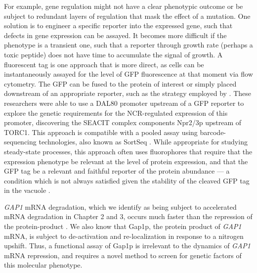 For example, gene regulation might not have a
clear phenotypic outcome or be subject to redundant layers of
regulation that mask the effect of a mutation. One solution is to
engineer a specific reporter into the expressed gene, such that
defects in gene expression can be assayed. It becomes more difficult
if the phenotype is a transient one, such that a reporter through
growth rate (perhaps a toxic peptide) does not have time to accumulate
the signal of growth. A fluorescent tag is one approach that is more
direct, as cells can be instantaneously assayed for the
level of GFP fluorescence at that moment via flow cytometry. The GFP
can be fused to the protein of interest or simply placed downstream of
an appropriate reporter, such as the strategy employed by 
\cite{neklesa2009genome}. 
These researchers were able to use a DAL80 promoter upstream of a GFP
reporter to explore the genetic requirements for the NCR-regulated
expression of this promoter, discovering the SEACIT complex components
Npr2/3p upstream of TORC1. 
This approach is compatible with a pooled assay using
barcode-sequencing technologies, also known as SortSeq
\parencite{kinney2010using,oikonomou2014systematic,peterman2016sort,de2017deciphering}.
While appropriate for studying steady-state processes, this approach
often uses fluorophores that require that the
expression phenotype be relevant at the level of protein expression,
and that the GFP tag be a relevant and faithful reporter of
the protein abundance --- a condition which is not always satisfied 
given the stability of the cleaved GFP tag in the vacuole
\parencite{conibear2002studying}.

\textit{GAP1} mRNA degradation, which we identify as
being subject to accelerated mRNA degradation in Chapter 2 and 3,
occurs much faster than the repression of the protein-product 
\parencite{hein1997ac}. We also
know that Gap1p, the protein product of \textit{GAP1} mRNA, is subject to
de-activation and re-localization in response to a nitrogen upshift.
Thus, a functional assay of Gap1p is irrelevant to the dynamics of
\textit{GAP1} mRNA repression, and requires a novel method to screen for
genetic factors of this molecular phenotype.  

